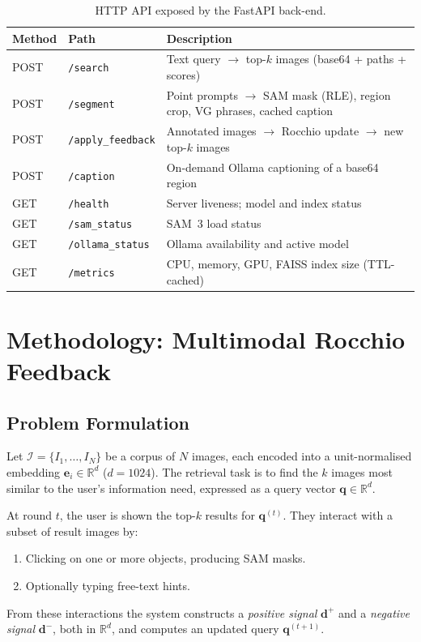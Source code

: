 \documentclass[12pt,a4paper]{article}
\newcommand{\vq}{\bm{q}}
\newcommand{\vd}{\bm{d}}
\newcommand{\ve}{\bm{e}}
\begin{document}
\begin{table}[h]
\centering
\caption{HTTP API exposed by the FastAPI back-end.}
\label{tab:api}
\begin{tabularx}{\textwidth}{@{}llX@{}}
\toprule
\textbf{Method} & \textbf{Path} & \textbf{Description} \\
\midrule
POST & \texttt{/search}          & Text query $\to$ top-$k$ images (base64 + paths + scores) \\
POST & \texttt{/segment}         & Point prompts $\to$ SAM mask (RLE), region crop, VG phrases, cached caption \\
POST & \texttt{/apply\_feedback} & Annotated images $\to$ Rocchio update $\to$ new top-$k$ images \\
POST & \texttt{/caption}         & On-demand Ollama captioning of a base64 region \\
GET  & \texttt{/health}          & Server liveness; model and index status \\
GET  & \texttt{/sam\_status}     & SAM~3 load status \\
GET  & \texttt{/ollama\_status}  & Ollama availability and active model \\
GET  & \texttt{/metrics}         & CPU, memory, GPU, FAISS index size (TTL-cached) \\
\bottomrule
\end{tabularx}
\end{table}

\section{Methodology: Multimodal Rocchio Feedback}
\label{sec:method}

\subsection{Problem Formulation}

Let $\mathcal{I} = \{I_1, \ldots, I_N\}$ be a corpus of $N$ images, each
encoded into a unit-normalised embedding $\ve_i \in \mathbb{R}^d$ ($d=1024$).
The retrieval task is to find the $k$ images most similar to the user's
information need, expressed as a query vector $\vq \in \mathbb{R}^d$.

At round $t$, the user is shown the top-$k$ results for $\vq^{(t)}$. They
interact with a subset of result images by:
\begin{enumerate}[leftmargin=1.5em,noitemsep]
  \item Clicking on one or more objects, producing SAM masks.
  \item Optionally typing free-text hints.
\end{enumerate}
From these interactions the system constructs a \emph{positive signal}
$\vd^+$ and a \emph{negative signal} $\vd^-$, both in $\mathbb{R}^d$, and
computes an updated query $\vq^{(t+1)}$.
\end{document}
